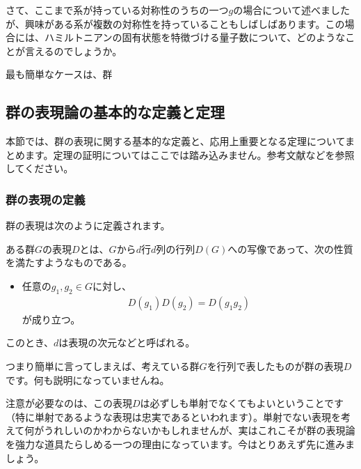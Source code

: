 \documentclass[uplatex,dvipdfmx,a4j]{jsarticle}
\begin{document}
さて、ここまで系が持っている対称性のうちの一つ$g$の場合について述べましたが、興味がある系が複数の対称性を持っていることもしばしばあります。この場合には、ハミルトニアンの固有状態を特徴づける量子数について、どのようなことが言えるのでしょうか。

最も簡単なケースは、群


\subsection{群の表現論の基本的な定義と定理}
本節では、群の表現に関する基本的な定義と、応用上重要となる定理についてまとめます。定理の証明についてはここでは踏み込みません。参考文献などを参照してください。

\subsubsection{群の表現の定義}
群の表現は次のように定義されます。
\begin{tcolorbox}[title=定義：群の表現]
	ある群$G$の表現$D$とは、$G$から$d$行$d$列の行列$D(G)$への写像であって、次の性質を満たすようなものである。
	\begin{itemize}
		\item 任意の$g_1, g_2 \in G$に対し、\begin{align}
			D(g_1)D(g_2) = D(g_1 g_2) \label{eq:def_expression}
		\end{align}が成り立つ。
	\end{itemize}
	このとき、$d$は表現の次元などと呼ばれる。
\end{tcolorbox}

つまり簡単に言ってしまえば、考えている群$G$を行列で表したものが群の表現$D$です。何も説明になっていませんね。

注意が必要なのは、この表現$D$は必ずしも単射でなくてもよいということです（特に単射であるような表現は忠実であるといわれます）。単射でない表現を考えて何がうれしいのかわからないかもしれませんが、実はこれこそが群の表現論を強力な道具たらしめる一つの理由になっています。今はとりあえず先に進みましょう。
\end{document}
